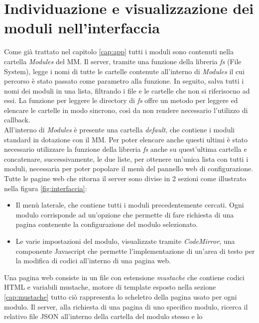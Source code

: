 \section{Individuazione e visualizzazione dei moduli nell'interfaccia}\label{cap:individuazione}
Come gi\`a trattato nel capitolo \ref{cap:app} tutti i moduli sono contenuti nella
cartella \textit{Modules} del MM. Il server, tramite una funzione della libreria \textit{fs} (File System),
legge i nomi di tutte le cartelle contenute all'interno di \textit{Modules} il cui percorso \`e stato passato
come parametro alla funzione. In seguito, salva tutti i nomi dei moduli
in una lista, filtrando i file e le cartelle che non si riferisocno ad essi.
La funzione per leggere le directory di \textit{fs} offre un metodo per leggere ed elencare le cartelle in
modo sincrono, cos\`i da non rendere necessario l'utilizzo di callback.\\
All'interno di \textit{Modules} \`e presente una cartella \textit{default}, che contiene
i moduli standard in dotazione con il MM. Per poter elencare anche questi ultimi \`e stato necessario utilizzare la funzione
della libreria \textit{fs} anche su quest'ultima cartella e concatenare, successivamente, le due liste,
per ottenere un'unica lista con tutti i moduli, necessaria per poter popolare il men\`u del pannello web di configurazione.\\
Tutte le pagine web che ritorna il server sono divise in 2 sezioni come illustrato nella figura \ref{fig:interfaccia}:
\begin{itemize}
\item Il men\`u laterale, che contiene tutti i moduli precedentemente cercati. Ogni modulo corrisponde ad un'opzione che permette di fare richiesta di una pagina
contenente la configurazione del modulo selezionato.
\item Le varie impostazioni del modulo, visualizzate tramite \textit{CodeMirror}\cite{CodeMirror}, una componente Javascript
che permette l'implementazione di un'area di testo per la modifica di codici all'interno di una pagina web.\\[1\baselineskip]
\end{itemize}
Una pagina web consiste in un file con estensione \textit{mustache} che contiene
codici HTML e variabili mustache, motore di template esposto nella sezione \ref{cap:mustache} tutto ci\`o rappresenta lo
scheletro della pagina usato per ogni modulo.
Il server, alla richiesta di una pagina di uno specifico modulo, ricerca il relativo file JSON all'interno della cartella del modulo stesso e lo
